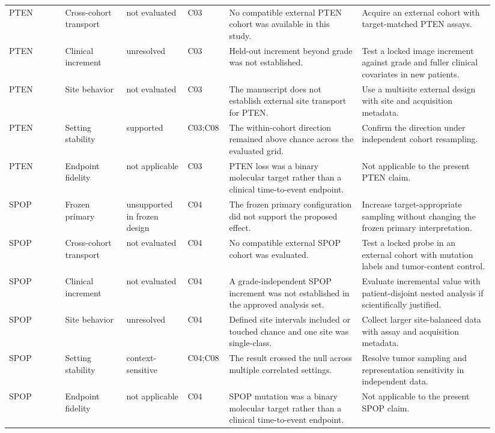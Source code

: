 \begin{longtable}{@{}p{0.11\linewidth}p{0.12\linewidth}p{0.12\linewidth}p{0.07\linewidth}p{0.26\linewidth}p{0.26\linewidth}@{}}
PTEN & Cross-cohort transport & not evaluated & C03 & No compatible external PTEN cohort was available in this study. & Acquire an external cohort with target-matched PTEN assays. \\
PTEN & Clinical increment & unresolved & C03 & Held-out increment beyond grade was not established. & Test a locked image increment against grade and fuller clinical covariates in new patients. \\
PTEN & Site behavior & not evaluated & C03 & The manuscript does not establish external site transport for PTEN. & Use a multisite external design with site and acquisition metadata. \\
PTEN & Setting stability & supported & C03;C08 & The within-cohort direction remained above chance across the evaluated grid. & Confirm the direction under independent cohort resampling. \\
PTEN & Endpoint fidelity & not applicable & C03 & PTEN loss was a binary molecular target rather than a clinical time-to-event endpoint. & Not applicable to the present PTEN claim. \\
SPOP & Frozen primary & unsupported in frozen design & C04 & The frozen primary configuration did not support the proposed effect. & Increase target-appropriate sampling without changing the frozen primary interpretation. \\
SPOP & Cross-cohort transport & not evaluated & C04 & No compatible external SPOP cohort was evaluated. & Test a locked probe in an external cohort with mutation labels and tumor-content control. \\
SPOP & Clinical increment & not evaluated & C04 & A grade-independent SPOP increment was not established in the approved analysis set. & Evaluate incremental value with patient-disjoint nested analysis if scientifically justified. \\
SPOP & Site behavior & unresolved & C04 & Defined site intervals included or touched chance and one site was single-class. & Collect larger site-balanced data with assay and acquisition metadata. \\
SPOP & Setting stability & context-sensitive & C04;C08 & The result crossed the null across multiple correlated settings. & Resolve tumor sampling and representation sensitivity in independent data. \\
SPOP & Endpoint fidelity & not applicable & C04 & SPOP mutation was a binary molecular target rather than a clinical time-to-event endpoint. & Not applicable to the present SPOP claim. \\

\end{longtable}
